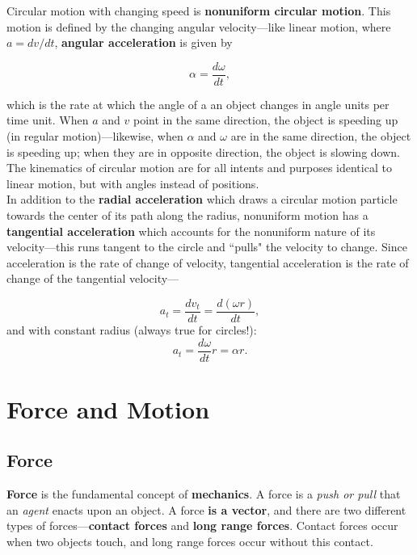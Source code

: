 \documentclass[12pt,letterpaper]{article}
\begin{document}
Circular motion with changing speed is \textbf{nonuniform circular motion}. This motion is defined by the changing angular velocity---like linear motion, where $a = dv/dt$, \textbf{angular acceleration} is given by

\begin{center}
	$$\alpha = \frac{d\omega}{dt},$$\linebreak
\end{center}

which is the rate at which the angle of a an object changes in angle units per time unit. When $a$ and $v$ point in the same direction, the object is speeding up (in regular motion)---likewise, when $\alpha$ and $\omega$ are in the same direction, the object is speeding up; when they are in opposite direction, the object is slowing down. \\

The kinematics of circular motion are for all intents and purposes identical to linear motion, but with angles instead of positions. \\

In addition to the \textbf{radial acceleration} which draws a circular motion particle towards the center of its path along the radius, nonuniform motion has a \textbf{tangential acceleration} which accounts for the nonuniform nature of its velocity---this runs tangent to the circle and ``pulls" the velocity to change. Since acceleration is the rate of change of velocity, tangential acceleration is the rate of change of the tangential velocity---

\begin{center}
	$$a_{t} = \frac{dv_{t}}{dt} = \frac{d(\omega r)}{dt},$$
	and with constant radius (always true for circles!):
	$$a_{t} = \frac{d\omega}{dt}r = \alpha r.$$\linebreak
\end{center}

\pagebreak

\section[Force and Motion]{Force and Motion}

\subsection[Force]{Force}

\textbf{Force} is the fundamental concept of \textbf{mechanics}. A force is a \textit{push or pull} that an \textit{agent} enacts upon an object. A force \textbf{is a vector}, and there are two different types of forces---\textbf{contact forces} and \textbf{long range forces}. Contact forces occur when two objects touch, and long range forces occur without this contact. \\
\end{document}
